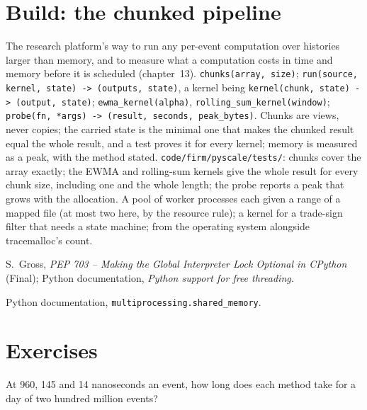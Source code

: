 \section{Build: the chunked pipeline}\label{bld:pl:python-at-scale:pyscale}

\begin{build}
 The research platform's way to run any per-event computation over histories larger than memory, and to measure what
a computation costs in time and memory before it is scheduled (chapter~13).
 \texttt{chunks(array, size)}; \texttt{run(source, kernel, state) -> (outputs, state)}, a kernel being
\texttt{kernel(chunk, state) -> (output, state)}; \texttt{ewma\_kernel(alpha)}, \texttt{rolling\_sum\_kernel(window)};
\texttt{probe(fn, *args) -> (result, seconds, peak\_bytes)}.
 Chunks are views, never copies; the carried state is the minimal one that makes the chunked result equal the whole
result, and a test proves it for every kernel; memory is measured as a peak, with the method stated.
 \texttt{code/firm/pyscale/tests/}: chunks cover the array exactly; the EWMA and rolling-sum kernels give the
whole result for every chunk size, including one and the whole length; the probe reports a peak that grows with the allocation.
 A pool of worker processes each given a range of a mapped file (at most two here, by the resource rule); a kernel
for a trade-sign filter that needs a state machine;  from the operating system alongside tracemalloc's count.
\end{build}

\begin{omsources}
\item S.~Gross, \emph{PEP 703 -- Making the Global Interpreter Lock Optional in CPython} (Final); Python documentation,
\emph{Python support for free threading}.
\item Python documentation, \texttt{multiprocessing.shared\_memory}.
\end{omsources}

\section{Exercises}

\begin{exercise}[$\star$]\label{exo:pl:python-at-scale:1}
At 960, 145 and 14 nanoseconds an event, how long does each method take for a day of two hundred million events?
\end{exercise}

